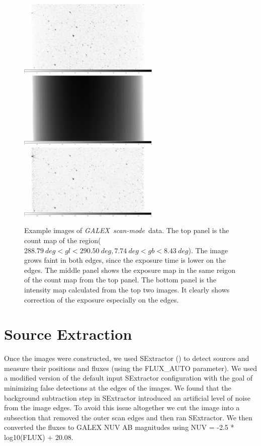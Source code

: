 \documentclass[12pt, preprint]{aastex}
\newcommand{\project}[1]{\textsl{#1}}
\newcommand{\galex}{\project{GALEX}}
\newcommand{\scanmode}{\project{scan-mode}}
\begin{document}
\begin{figure}[p]
\begin{center}
\includegraphics[width=0.6\textwidth]{figures/count.pdf}
\includegraphics[width=0.6\textwidth]{figures/exp.pdf}
\includegraphics[width=0.6\textwidth]{figures/intensity.pdf}
\end{center}
\caption{%
  \label{map}
  Example images of \galex\ \scanmode\ data.
  The top panel is the count map of the region($288.79\ deg<gl<290.50\ deg, 7.74\ deg<gb<8.43\ deg$). 
  The image grows faint in both edges, since the exposure time is lower on the edges.
  The middle panel shows the exposure map in the same reigon of the count map from the top panel.
  The bottom panel is the intensity map calculated from the top two images. 
  It clearly shows correction of the exposure especially on the edges.
  }
\end{figure}

\section{Source Extraction}
Once the images were constructed, we used SExtractor (\cite{sextractor}) to detect sources and measure their positions and fluxes (using the FLUX\_AUTO parameter). We used a modified version of the default input SExtractor configuration with the goal of minimizing false detections at the edges of the images. We found that the background subtraction step in SExtractor introduced an artificial level of noise from the image edges. To avoid this issue altogether we cut the image into a subsection that removed the outer scan edges and then ran SExtractor. We then converted the fluxes to GALEX NUV AB magnitudes using NUV = -2.5 * log10(FLUX) + 20.08.
\end{document}
